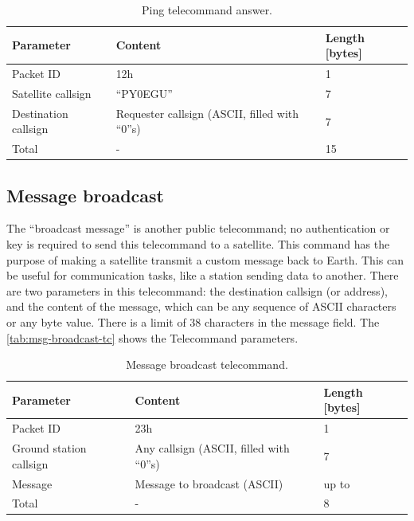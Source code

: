 \begin{table}[!ht]
    \centering
    \begin{tabular}{lll}
        \toprule[1.5pt]
        \textbf{Parameter}      & \textbf{Content}                               & \textbf{Length [bytes]} \\
        \midrule
        Packet ID               & 12h                                            & 1 \\
        Satellite callsign      & ``PY0EGU''                                     & 7 \\
        Destination callsign    & Requester callsign (ASCII, filled with ``0''s) & 7 \\
        \midrule
        Total                   & -                                              & 15 \\
        \bottomrule[1.5pt]
    \end{tabular}
    \caption{Ping telecommand answer.}
    \label{tab:ping-tc-ans}
\end{table}

\subsection{Message broadcast}

The ``broadcast message'' is another public telecommand; no authentication or key is required to send this telecommand to a satellite. This command has the purpose of making a satellite transmit a custom message back to Earth. This can be useful for communication tasks, like a station sending data to another. There are two parameters in this telecommand: the destination callsign (or address), and the content of the message, which can be any sequence of ASCII characters or any byte value. There is a limit of 38 characters in the message field. The \autoref{tab:msg-broadcast-tc} shows the Telecommand parameters.

\begin{table}[!ht]
    \centering
    \begin{tabular}{lll}
        \toprule[1.5pt]
        \textbf{Parameter}      & \textbf{Content}                         & \textbf{Length [bytes]} \\
        \midrule
        Packet ID               & 23h                                      & 1 \\
        Ground station callsign & Any callsign (ASCII, filled with ``0''s) & 7 \\
        Message                 & Message to broadcast (ASCII)             & up to  \\
        \midrule
        Total                   & -                                        & 8 \\
        \bottomrule[1.5pt]
    \end{tabular}
    \caption{Message broadcast telecommand.}
    \label{tab:msg-broadcast-tc}
\end{table}

